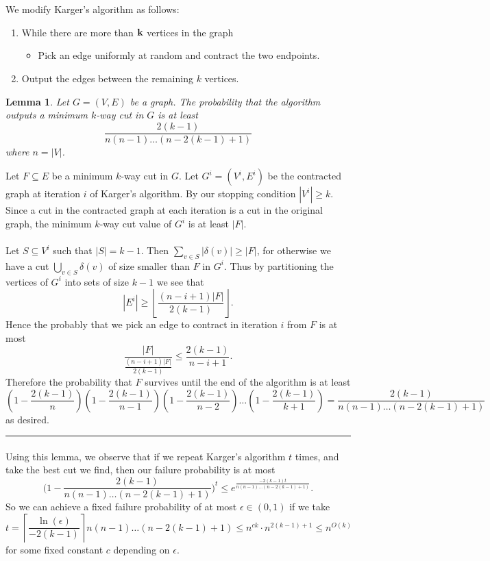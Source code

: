 \documentclass[letterpaper,12pt,oneside,onecolumn]{article}
\newenvironment{proof}{{\bf Proof:  }}{\hfill\rule{2mm}{2mm}}
\newtheorem{lemma}[fact]{Lemma}
\newcommand{\ceil}[1]{\ensuremath{\left\lceil#1\right\rceil}}
\newcommand{\floor}[1]{\ensuremath{\left\lfloor#1\right\rfloor}}
\begin{document}
\section{}
\paragraph{}
We modify Karger's algorithm as follows:
\begin{enumerate}
\item While there are more than $\bf{k}$ vertices in the graph
	\begin{itemize}
		\item Pick an edge uniformly at random and contract the two endpoints.
	\end{itemize}
\item Output the edges between the remaining $k$ vertices.
\end{enumerate}
\begin{lemma}
Let $G=(V,E)$ be a graph. The probability that the algorithm outputs a minimum $k$-way cut in $G$ is at least $$\frac{2(k-1)}{n(n-1)\dots(n-2(k-1)+1)}$$ where $n = |V|$.
\end{lemma}
\begin{proof}
Let $F\subseteq E$ be a minimum $k$-way cut in $G$. Let $G^i=(V^i,E^i)$ be the contracted graph at iteration $i$ of Karger's algorithm. By our stopping condition $|V^i| \geq k$. Since a cut in the contracted graph at each iteration is a cut in the original graph, the minimum $k$-way cut value of $G^i$ is at least $|F|$.
\paragraph{}
Let $S\subseteq V^i$ such that $|S|=k-1$. Then $\sum_{v \in S} |\delta(v)| \geq |F|$, for otherwise we have a cut $\bigcup_{v\in S} \delta(v)$ of size smaller than $F$ in $G^i$. Thus by partitioning the vertices of $G^i$ into sets of size $k-1$ we see that
$$|E^i| \geq \floor{\frac{(n-i+1)|F|}{2(k-1)}}.$$
Hence the probably that we pick an edge to contract in iteration $i$ from $F$ is at most
$$ \frac{|F|}{\frac{(n-i+1)|F|}{2(k-1)}} \leq \frac{2(k-1)}{n-i+1}.$$
Therefore the probability that $F$ survives until the end of the algorithm is at least
$$(1-\frac{2(k-1)}{n})(1-\frac{2(k-1)}{n-1})(1-\frac{2(k-1)}{n-2})\dots(1-\frac{2(k-1)}{k+1}) = \frac{2(k-1)}{n(n-1)\dots(n-2(k-1)+1)}$$
as desired.
\end{proof}
\paragraph{}
Using this lemma, we observe that if we repeat Karger's algorithm $t$ times, and take the best cut we find, then our failure probability is at most 
$$\big(1 -  \frac{2(k-1)}{n(n-1)\dots(n-2(k-1)+1)}\big)^t \leq e^\frac{-2(k-1)t}{n(n-1)\dots(n-2(k-1)+1)}.$$
So we can achieve a fixed failure probability of at most $\epsilon \in (0,1)$ if we take 
$$t = \ceil{\frac{\ln(\epsilon)}{-2(k-1)}}n(n-1)\dots(n-2(k-1)+1) \leq n^{ck}\cdot n^{2(k-1)+1} \leq n^{O(k)}$$
for some fixed constant $c$ depending on $\epsilon$.
\end{document}
